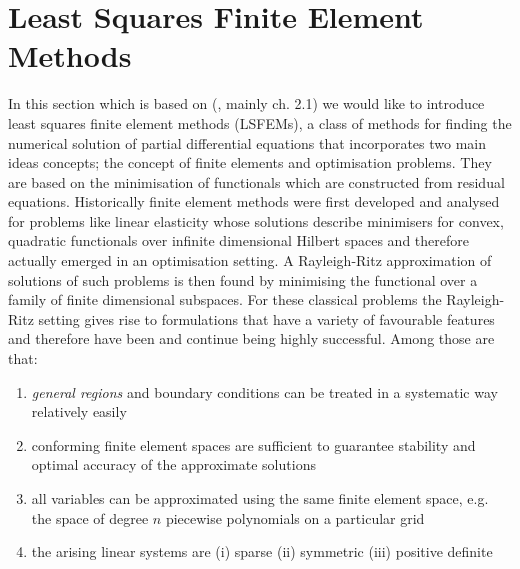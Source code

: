 \documentclass[../draft_1.tex]{subfiles}
\begin{document}
\section{Least Squares Finite Element Methods}

In this section which is based on (\cite{bochev2009least}, mainly ch. 2.1) we would like to introduce least squares finite element methods (LSFEMs), a class of methods for finding the numerical solution of partial differential equations that incorporates two main ideas concepts; the concept of finite elements and optimisation problems. They are based on the minimisation of functionals which are constructed from residual equations. Historically finite element methods were first developed and analysed for problems like linear elasticity whose solutions describe minimisers for convex, quadratic functionals over infinite dimensional Hilbert spaces and therefore actually emerged in an optimisation setting. A Rayleigh-Ritz approximation of solutions of such problems is then found by minimising the functional over a family of finite dimensional subspaces. For these classical problems the Rayleigh-Ritz setting gives rise to formulations that have a variety of favourable features and therefore have been and continue being highly successful.  Among those are that:

\begin{enumerate}
	\item \textit{general regions} and boundary conditions can be treated in a systematic way relatively easily
	\item conforming finite element spaces are sufficient to guarantee stability and optimal accuracy of the approximate solutions
	\item all variables can be approximated using the same finite element space, e.g. the space of degree $n$ piecewise polynomials on a particular grid
	\item the arising linear systems are 
	\subitem (i) sparse
	\subitem (ii) symmetric
	\subitem (iii) positive definite
\end{enumerate}
\end{document}
